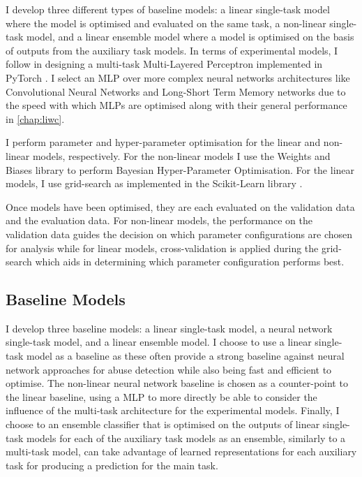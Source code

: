 I develop three different types of baseline models: a linear single-task model where the model is optimised and evaluated on the same task, a non-linear single-task model, and a linear ensemble model where a model is optimised on the basis of outputs from the auxiliary task models.
In terms of experimental models, I follow \citet{Waseem:2018} in designing a multi-task Multi-Layered Perceptron implemented in PyTorch \citep{Paszke:2019}. I select an MLP over more complex neural networks architectures like Convolutional Neural Networks and Long-Short Term Memory networks due to the speed with which MLPs are optimised along with their general performance in \cref{chap:liwc}.

I perform parameter and hyper-parameter optimisation for the linear and non-linear models, respectively.
For the non-linear models I use the Weights and Biases library \citep{Wandb} to perform Bayesian Hyper-Parameter Optimisation.
For the linear models, I use grid-search as implemented in the Scikit-Learn library \citep{Pedregosa:2011}.

Once models have been optimised, they are each evaluated on the validation data and the evaluation data.
For non-linear models, the performance on the validation data guides the decision on which parameter configurations are chosen for analysis while for linear models, cross-validation is applied during the grid-search which aids in determining which parameter configuration performs best.

\subsection{Baseline Models}\label{sub:mtl_baselines}
I develop three baseline models: a linear single-task model, a neural network single-task model, and a linear ensemble model.
I choose to use a linear single-task model as a baseline as these often provide a strong baseline against neural network approaches for abuse detection \citep{Cite someone who says that here} while also being fast and efficient to optimise.
The non-linear neural network baseline is chosen as a counter-point to the linear baseline, using a MLP to more directly be able to consider the influence of the multi-task architecture for the experimental models.
Finally, I choose to an ensemble classifier that is optimised on the outputs of linear single-task models for each of the auxiliary task models as an ensemble, similarly to a multi-task model, can take advantage of learned representations for each auxiliary task for producing a prediction for the main task.

